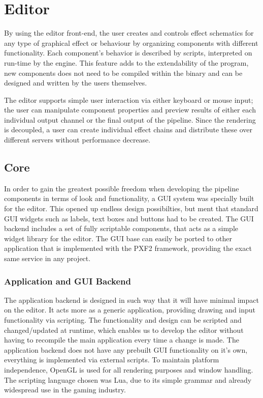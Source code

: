 
\chapter{Editor}
 
By using the editor front-end, the user creates and controls effect schematics for any type of graphical effect or behaviour by organizing components with different functionality. Each component’s behavior is described by scripts, interpreted on run-time by the engine. This feature adds to the extendability of the program, new components does not need to be compiled within the binary and can be designed and written by the users themselves.

The editor supports simple user interaction via either keyboard or mouse input; the user can manipulate component properties and preview results of either each individual output channel or the final output of the pipeline. Since the rendering is decoupled, a user can create individual effect chains and distribute these over different servers without performance decrease. 

\section{Core}
In order to gain the greatest possible freedom when developing the pipeline components in terms of look and functionality, a GUI system was specially built for the editor. This opened up endless design possibilties, but ment that standard GUI widgets such as labels, text boxes and buttons had to be created. The GUI backend includes a set of fully scriptable components, that acts as a simple widget library for the editor. The GUI base can easily be ported to other application that is implemented with the PXF2 framework, providing the exact same service in any project. 

\subsection{Application and GUI Backend}
The application backend is designed in such way that it will have minimal impact on the editor. It acts more as a generic application, providing drawing and input functionality via scripting. The functionality and design can be scripted and changed/updated at runtime, which enables us to develop the editor without having to recompile the main application every time a change is made. The application backend does not have any prebuilt GUI functionality on it's own, everything is implemented via external scripts. To maintain platform independence, OpenGL is used for all rendering purposes and window handling. The scripting language chosen was Lua, due to its simple grammar and already widespread use in the gaming industry.

